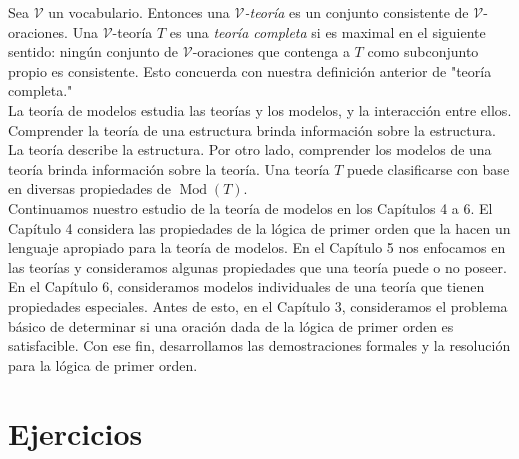 \documentclass[12pt,a4paper]{book}
\newcommand{\comillas}[1]{"#1"}
\newcommand{\VV}{\mathcal{V}}
\DeclareMathOperator{\Mod}{Mod}
\begin{document}
    Sea $\VV$ un vocabulario. Entonces una \textit{$\VV$-teoría} es un conjunto consistente de $\VV$-oraciones. Una
    $\VV$-teoría $T$ es una \textit{teoría completa} si es maximal en el siguiente sentido: ningún conjunto de
    $\VV$-oraciones que contenga a $T$ como subconjunto propio es consistente. Esto concuerda con nuestra definición
    anterior de \comillas{teoría completa.}\\
    La teoría de modelos estudia las teorías y los modelos, y la interacción entre ellos. Comprender la teoría de una
    estructura brinda información sobre la estructura. La teoría describe la estructura. Por otro lado, comprender los
    modelos de una teoría brinda información sobre la teoría. Una teoría $T$ puede clasificarse con base en diversas
    propiedades de $\Mod(T)$.\\
    Continuamos nuestro estudio de la teoría de modelos en los Capítulos 4 a 6. El Capítulo 4 considera las propiedades de
    la lógica de primer orden que la hacen un lenguaje apropiado para la teoría de modelos. En el Capítulo 5 nos
    enfocamos en las teorías y consideramos algunas propiedades que una teoría puede o no poseer. En el Capítulo 6,
    consideramos modelos individuales de una teoría que tienen propiedades especiales. Antes de esto, en el Capítulo 3,
    consideramos el problema básico de determinar si una oración dada de la lógica de primer orden es satisfacible.
    Con ese fin, desarrollamos las demostraciones formales y la resolución para la lógica de primer orden.

    \section*{Ejercicios}
\end{document}
